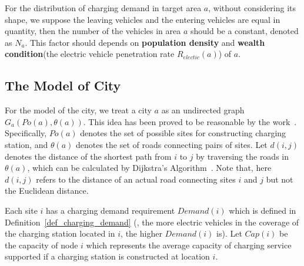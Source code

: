 For the distribution of charging demand in target area $a$,
without considering its shape, we suppose the leaving vehicles and the entering vehicles are equal in quantity,
then the number of the vehicles in area $a$ should be a constant, denoted as $N_{a}$.
This factor should depends on \textbf{population density} and \textbf{wealth condition}(the electric vehicle penetration rate $R_{electic}(a)$) of $a$.





\subsection{The Model of City}
For the model of the city,
we treat a city $a$ as an undirected graph $G_{a}(Po(a),\theta(a))$.
This idea has been proved to be reasonable by the work~\cite{lam2014electric}.
Specifically, $Po(a)$ denotes the set of possible sites for constructing charging station,
and $\theta(a)$ denotes the set of roads connecting pairs of sites.
Let $d(i, j)$ denotes the distance of the shortest path from $i$ to $j$ by traversing the roads in $\theta(a)$,
which can be calculated by Dijkstra's Algorithm~\cite{Dijkstra}.
Note that, here $d(i, j)$ refers to the distance of an actual road connecting sites $i$ and $j$ but not the Euclidean distance.

Each site $i$ has a charging demand requirement $Demand(i)$ which is defined in Definition~\ref{def_charging_demand}
(\eg, the more electric vehicles in the coverage of the charging station located in $i$, the higher $Demand(i)$ is).
Let $Cap(i)$ be the capacity of node $i$ which represents the average capacity of charging service supported if a charging station is constructed at location $i$.

